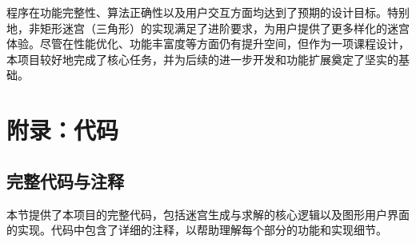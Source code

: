 \documentclass[UTF8]{report}
\theoremstyle{MyLineTheoremStyle} %
\theoremstyle{MyBlockTheoremStyle} %
\theoremstyle{MySubsubsectionStyle} %
\begin{document}
程序在功能完整性、算法正确性以及用户交互方面均达到了预期的设计目标。特别地，非矩形迷宫（三角形）的实现满足了进阶要求，为用户提供了更多样化的迷宫体验。尽管在性能优化、功能丰富度等方面仍有提升空间，但作为一项课程设计，本项目较好地完成了核心任务，并为后续的进一步开发和功能扩展奠定了坚实的基础。





\chapter{附录：代码}

\section*{完整代码与注释}
本节提供了本项目的完整代码，包括迷宫生成与求解的核心逻辑以及图形用户界面的实现。代码中包含了详细的注释，以帮助理解每个部分的功能和实现细节。
\end{document}
